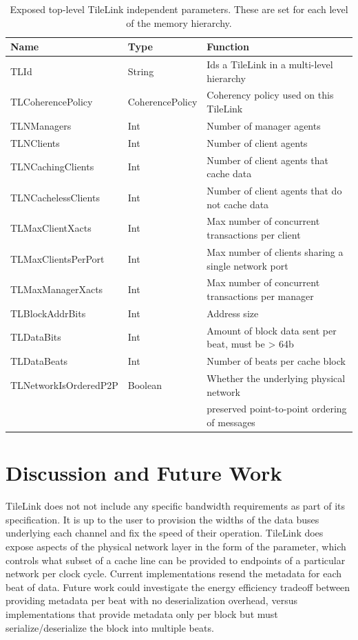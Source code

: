 \begin{table}[ht]
\begin{center}
\begin{tabular}{|l|l|l|}
    \hline
Name & Type & Function \\ \hline \hline
TLId & String & Ids a TileLink in a multi-level hierarchy \\ \hline
TLCoherencePolicy & CoherencePolicy & Coherency policy used on this TileLink \\ \hline
TLNManagers & Int & Number of manager agents \\ \hline
TLNClients & Int & Number of client agents \\ \hline
TLNCachingClients & Int & Number of client agents that cache data \\ \hline
TLNCachelessClients & Int & Number of client agents that do not cache data \\ \hline
TLMaxClientXacts & Int & Max number of concurrent transactions per client \\ \hline
TLMaxClientsPerPort & Int & Max number of clients sharing a single network port \\ \hline
TLMaxManagerXacts & Int & Max number of concurrent transactions per manager \\ \hline
TLBlockAddrBits & Int & Address size \\ \hline
TLDataBits & Int & Amount of block data sent per beat, must be > 64b \\ \hline
TLDataBeats & Int & Number of beats per cache block \\ \hline
TLNetworkIsOrderedP2P & Boolean & Whether the underlying physical network \\
                      &         & preserved point-to-point ordering of messages \\ \hline
\end{tabular}
\end{center}
\caption{Exposed top-level TileLink independent parameters. These are set for each level of the memory hierarchy.}
\label{tab:tlparams}
\end{table}

\section{Discussion and Future Work}

TileLink does not not include any specific bandwidth requirements as part of its specification.
It is up to the user to provision the widths of the data buses underlying each channel and fix the speed of their operation.  
TileLink does expose aspects of the physical network layer in the form of the  parameter, which
controls what subset of a cache line can be provided to endpoints of a particular network per clock cycle.
Current implementations resend the metadata for each beat of data.
Future work could investigate the energy efficiency tradeoff between providing metadata per beat with no deserialization overhead,
versus implementations that provide metadata only per block but must serialize/deserialize the block into multiple beats. 


